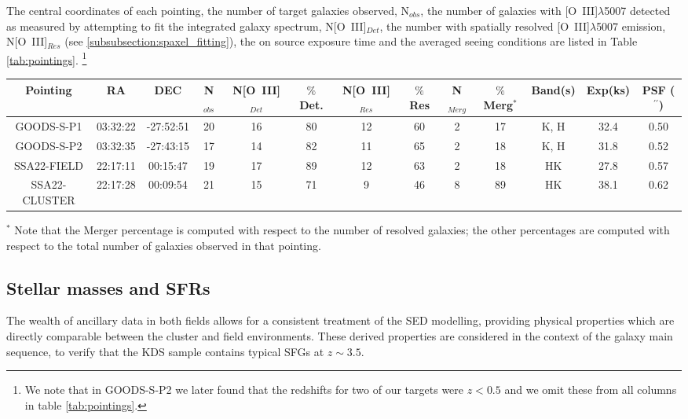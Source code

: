 \documentclass[fleqn,usenatbib]{mn2e}
\begin{document}
The central coordinates of each pointing, the number of target galaxies observed, N$_{obs}$, the number of galaxies with [O~{\sc III}]$\lambda$5007 detected as measured by attempting to fit the integrated galaxy spectrum, N[O~{\sc III}]$_{Det}$, the number with spatially resolved [O~{\sc III}]$\lambda$5007 emission, N[O~{\sc III}]$_{Res}$ (see \cref{subsubsection:spaxel_fitting}), the on source exposure time and the averaged seeing conditions are listed in Table \ref{tab:pointings}. \footnote{We note that in GOODS-S-P2 we later found that the redshifts for two of our targets were $z < 0.5$ and we omit these from all columns in table \ref{tab:pointings}.}

\begin{table*}
\centering
\begin{threeparttable}
\caption{Summary of KDS pointing statistics for the full observed sample of 77 galaxies}
\label{tab:pointings}
\begin{tabular}{c c c c c c c c c c c c c}

 \hline
Pointing & RA & DEC & N$_{obs}$ & N[O~{\sc III}]$_{Det}$ & $\%$ Det. & N[O~{\sc III}]$_{Res}$ & $\%$ Res & N$_{Merg}$ & $\%$ Merg$^{*}$ & Band(s) & Exp(ks) & PSF ($^{\prime\prime}$)  \\
 \hline
 GOODS-S-P1 & 03:32:22 & -27:52:51 & 20 & 16 & 80 & 12 & 60 & 2 & 17 & K, H & 32.4 & 0.50 \\
GOODS-S-P2 & 03:32:35 & -27:43:15 & 17 & 14 & 82 & 11 & 65 & 2 & 18 & K, H & 31.8 & 0.52 \\
SSA22-FIELD & 22:17:11 & 00:15:47 & 19 & 17 & 89 & 12 & 63 & 2 & 18 & HK & 27.8 & 0.57 \\
SSA22-CLUSTER & 22:17:28 & 00:09:54 & 21 & 15 & 71 & 9 & 46 & 8 & 89 & HK & 38.1 & 0.62 \\
 \hline
\end{tabular}
\begin{tablenotes}
      \small
      \item $^{*}$ Note that the Merger percentage is computed with respect to the number of resolved galaxies; the other percentages are computed with respect to the total number of galaxies observed in that pointing.
    \end{tablenotes}
  \end{threeparttable}
  \end{table*}

\subsection{Stellar masses and SFRs}\label{subsec:stellar_masses_and_sfrs}
The wealth of ancillary data in both fields allows for a consistent treatment of the SED modelling, providing physical properties which are directly comparable between the cluster and field environments.
These derived properties are considered in the context of the galaxy main sequence, to verify that the KDS sample contains typical SFGs at $z\sim3.5$.   
\end{document}
